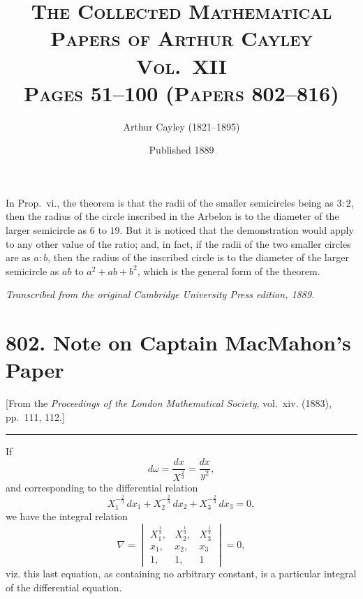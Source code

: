 \documentclass[11pt,a4paper]{book}
\begin{document}
In Prop.~vi., the theorem is that the radii of the smaller semicircles being as $3:2$, then the radius of the circle inscribed in the Arbelon is to the diameter of the larger semicircle as $6$ to $19$. But it is noticed that the demonstration would apply to any other value of the ratio; and, in fact, if the radii of the two smaller circles are as $a:b$, then the radius of the inscribed circle is to the diameter of the larger semicircle as $ab$ to $a^2 + ab + b^2$, which is the general form of the theorem.
\clearpage


\title{\scshape The Collected Mathematical Papers of Arthur Cayley\\Vol.\ XII\\[0.5em]\large Pages 51--100 (Papers 802--816)}
\author{Arthur Cayley (1821--1895)}
\date{Published 1889}


\thispagestyle{empty}
\begin{center}
\textit{Transcribed from the original Cambridge University Press edition, 1889.}
\end{center}


\newpage

\section*{802. Note on Captain MacMahon's Paper}

\begin{center}
\small[From the \textit{Proceedings of the London Mathematical Society}, vol.~xiv. (1883),\\
pp.~111, 112.]
\end{center}

\bigskip

\begin{center}
\rule{0.5\textwidth}{0.4pt}
\end{center}

\noindent
If
\[
d\omega = \frac{dx}{X^{\frac{2}{3}}} = \frac{dx}{y^{2}},
\]
and corresponding to the differential relation
\[
X_1^{-\frac{2}{3}}\,dx_1 + X_2^{-\frac{2}{3}}\,dx_2 + X_3^{-\frac{2}{3}}\,dx_3 = 0,
\]
we have the integral relation
\[
\nabla = \begin{vmatrix}
X_1^{\frac{1}{3}}, & X_2^{\frac{1}{3}}, & X_3^{\frac{1}{3}} \\
x_1, & x_2, & x_3 \\
1, & 1, & 1
\end{vmatrix} = 0,
\]
viz. this last equation, as containing no arbitrary constant, is a particular integral of the differential equation.
\end{document}

